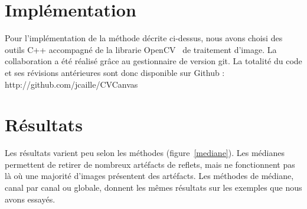 \documentclass[12pt,a4paper]{article}
\begin{document}
\section{Implémentation}

Pour l'implémentation de la méthode décrite ci-dessus, nous avons choisi des outils C++ accompagné de la librarie OpenCV~\citep{opencv_library} de traitement d'image. La collaboration a été réalisé grâce au gestionnaire de version git. La totalité du code et ses révisions antérieures sont donc disponible sur Github : http://github.com/jcaille/CVCanvas

\section{Résultats}
Les résultats varient peu selon les méthodes (figure~\ref{mediane}). Les médianes permettent de retirer de nombreux artéfacts de reflets, mais ne fonctionnent pas là où une majorité d'images présentent des artéfacts. Les méthodes de médiane, canal par canal ou globale, donnent les mêmes résultats sur les exemples que nous avons essayés.
\end{document}
